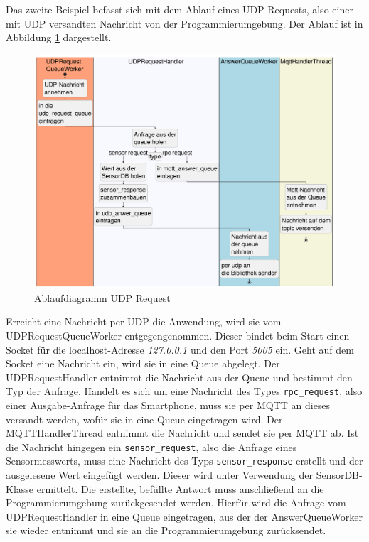\documentclass[11pt,a4paper]{report}
\begin{document}
Das zweite Beispiel befasst sich mit dem Ablauf eines UDP-Requests, also einer mit UDP versandten Nachricht von der Programmierumgebung.
Der Ablauf ist in Abbildung \ref{fig:serverUDPReqPath} dargestellt.
\begin{figure}[htbp]
  \centering
  \includegraphics[width=\textwidth]{images/UDPRequestServerPath}
  \caption{Ablaufdiagramm UDP Request}
  \label{fig:serverUDPReqPath}
\end{figure}
Erreicht eine Nachricht per UDP die Anwendung, wird sie vom UDPRequestQueueWorker entgegengenommen.
Dieser bindet beim Start einen Socket für die localhost-Adresse \textit{127.0.0.1} und den Port \textit{5005}  ein.
Geht auf dem Socket eine Nachricht ein, wird sie in eine Queue abgelegt.
Der UDPRequestHandler entnimmt die Nachricht aus der Queue und bestimmt den Typ der Anfrage.
Handelt es sich um eine Nachricht des Types \texttt{rpc\_request}, also einer Ausgabe-Anfrage für das Smartphone, muss sie per MQTT an dieses  versandt werden, wofür sie in eine Queue eingetragen wird.
Der MQTTHandlerThread entnimmt die Nachricht und sendet sie per MQTT ab.
Ist die Nachricht hingegen ein \texttt{sensor\_request}, also die Anfrage eines Sensormesswerts, muss eine Nachricht des Typs \texttt{sensor\_response} erstellt und der ausgelesene Wert eingefügt werden.
Dieser wird unter Verwendung der SensorDB-Klasse ermittelt.
Die erstellte, befüllte Antwort muss anschließend an die Programmierumgebung zurückgesendet werden.
Hierfür wird die Anfrage vom UDPRequestHandler in eine Queue eingetragen, aus der der AnswerQueueWorker sie wieder entnimmt und sie an die Programmierumgebung zurücksendet.
\end{document}
